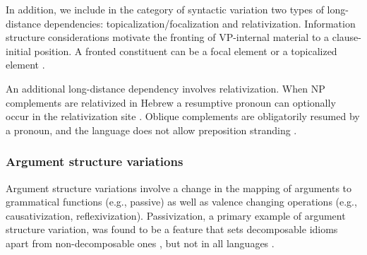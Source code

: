 \documentclass[output=paper]{langsci/langscibook}
\begin{document}
In addition, we include in the category of syntactic variation two types of long-distance dependencies: topicalization/focalization and relativization. Information structure considerations motivate the fronting of VP-internal material to a clause-initial position. A fronted constituent can be a focal element  or a topicalized element .

\eal
\zl

An additional long-distance dependency involves relativization. When NP complements are relativized in Hebrew a resumptive pronoun can optionally occur in the relativization site . Oblique complements are obligatorily resumed by a pronoun, and the language does not allow preposition stranding .

\eal
\zl

\subsubsection{Argument structure variations}

Argument structure variations involve a change in the mapping of arguments to grammatical functions (e.g., passive) as well as valence changing operations (e.g., causativization, reflexivization). Passivization, a primary example of argument structure variation, was
found to be a feature that sets decomposable idioms apart from non-decomposable ones
\citep{nunberg94}, but not in all languages \citep{bargmannsailer15}.
\end{document}
